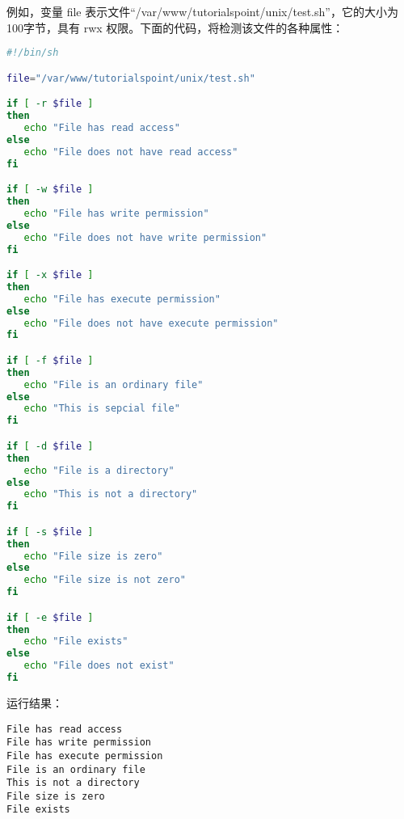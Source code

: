 例如，变量 file 表示文件“/var/www/tutorialspoint/unix/test.sh”，它的大小为100字节，具有 rwx 权限。下面的代码，将检测该文件的各种属性：
\begin{lstlisting}[language=sh]
#!/bin/sh

file="/var/www/tutorialspoint/unix/test.sh"

if [ -r $file ]
then
   echo "File has read access"
else
   echo "File does not have read access"
fi

if [ -w $file ]
then
   echo "File has write permission"
else
   echo "File does not have write permission"
fi

if [ -x $file ]
then
   echo "File has execute permission"
else
   echo "File does not have execute permission"
fi

if [ -f $file ]
then
   echo "File is an ordinary file"
else
   echo "This is sepcial file"
fi

if [ -d $file ]
then
   echo "File is a directory"
else
   echo "This is not a directory"
fi

if [ -s $file ]
then
   echo "File size is zero"
else
   echo "File size is not zero"
fi

if [ -e $file ]
then
   echo "File exists"
else
   echo "File does not exist"
fi
\end{lstlisting}
运行结果：
\begin{verbatim}
File has read access
File has write permission
File has execute permission
File is an ordinary file
This is not a directory
File size is zero
File exists
\end{verbatim}

